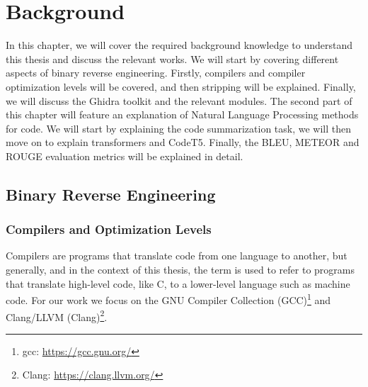 \chapter{Background}
\label{background}



In this chapter, we will cover the required background knowledge to understand this thesis and discuss the relevant works. We will start by covering different aspects of binary reverse engineering. Firstly, compilers and compiler optimization levels will be covered, and then stripping will be explained. Finally, we will discuss the Ghidra toolkit and the relevant modules. The second part of this chapter will feature an explanation of Natural Language Processing methods for code. We will start by explaining the code summarization task, we will then move on to explain transformers and CodeT5. Finally, the BLEU, METEOR and ROUGE evaluation metrics will be explained in detail.
\section{Binary Reverse Engineering}

\subsection{Compilers and Optimization Levels}
Compilers are programs that translate code from one language to another, but generally, and in the context of this thesis, the term is used to refer to programs that translate high-level code, like C, to a lower-level language such as machine code. For our work we focus on the GNU Compiler Collection (GCC)\footnote{gcc: \url{https://gcc.gnu.org/}} and Clang/LLVM (Clang)\footnote{Clang: \url{https://clang.llvm.org/}}.

